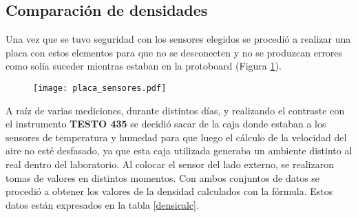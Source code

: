 \subsection{Comparación de densidades} \label{cap:densidades}

Una vez que se tuvo seguridad con los sensores elegidos se procedió a realizar una placa con estos elementos para que no se desconecten y no se produzcan errores como solía suceder mientras estaban en la protoboard (Figura \ref{fig:sensoresa}). \\
\begin{figure}[H]
	\centering
	\texttt{[image: placa\_sensores.pdf]}
	\label{fig:sensoresa}
\end{figure}

A raíz de varias mediciones, durante distintos días, y realizando el contraste con el instrumento \textbf{TESTO 435} se decidió sacar de la caja donde estaban a los sensores de temperatura y humedad para que luego el cálculo de la velocidad del aire no esté desfasado, ya que esta caja utilizada generaba un ambiente distinto al real dentro del laboratorio. Al colocar el sensor del lado externo, se realizaron tomas de valores en distintos momentos. Con ambos conjuntos de datos se procedió a obtener los valores de la densidad calculados con la fórmula. Estos datos están expresados en la tabla \ref{densicalc}. 


